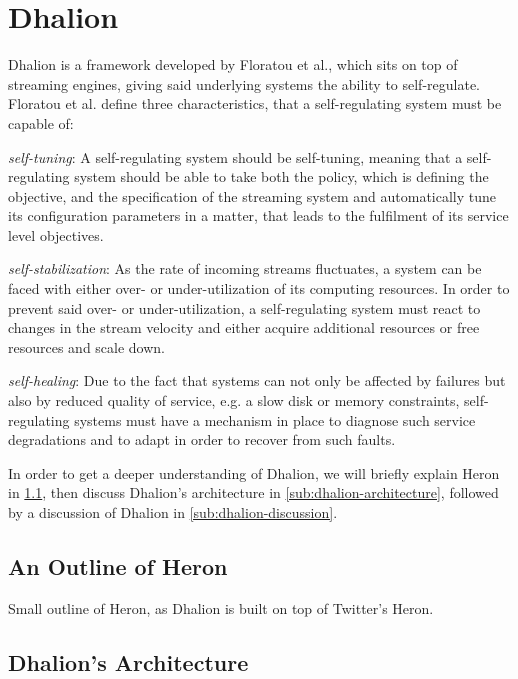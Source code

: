     \section{Dhalion}
    \label{sec:dhalion}
    Dhalion is a framework developed by Floratou et al., which sits on top of streaming engines, giving said underlying systems the ability to self-regulate.  
    Floratou et al. define three characteristics, that a self-regulating system must be capable of:
    
    \quad \textit{self-tuning}: A self-regulating system should be self-tuning, meaning that a self-regulating system should 
    be able to take both the policy, which is defining the objective, and the specification of the streaming system and automatically tune 
    its configuration parameters in a matter, that leads to the fulfilment of its service level objectives.
    
    \quad \textit{self-stabilization}: As the rate of incoming streams fluctuates, a system can be faced with either over- or under-utilization of its computing resources. 
    In order to prevent said over- or under-utilization, a self-regulating system must react to changes in the stream velocity and either acquire additional resources 
    or free resources and scale down.

    \quad \textit{self-healing}: Due to the fact that systems can not only be affected by failures but also by reduced quality of service, 
    e.g. a slow disk or memory constraints, self-regulating systems must have a mechanism in place to diagnose such service degradations and to adapt 
    in order to recover from such faults.

    In order to get a deeper understanding of Dhalion, we will briefly explain Heron in \ref{sub:heron-outline}, then discuss Dhalion's architecture in \ref{sub:dhalion-architecture}, 
    followed by a discussion of Dhalion in \ref{sub:dhalion-discussion}.

        \subsection{An Outline of Heron}
        \label{sub:heron-outline}
        Small outline of Heron, as Dhalion is built on top of Twitter's Heron.

        \subsection{Dhalion's Architecture}
        
